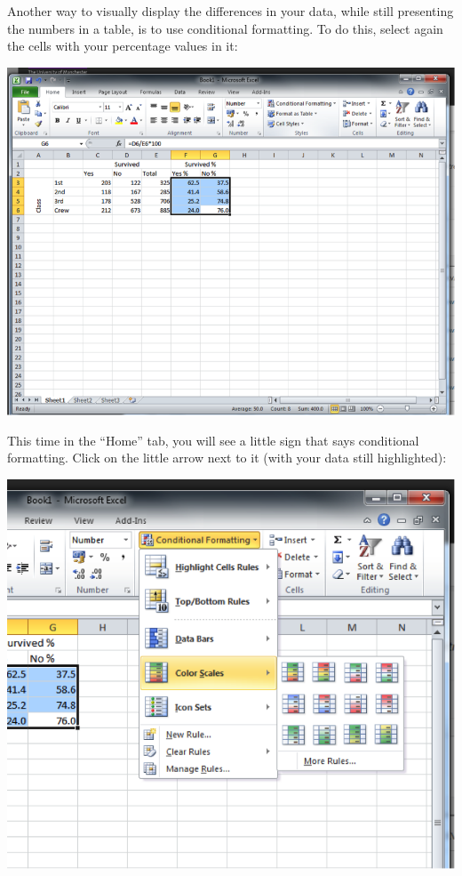\documentclass[]{book}
\theoremstyle{definition}
\theoremstyle{definition}
\theoremstyle{definition}
\theoremstyle{remark}
\begin{document}
Another way to visually display the differences in your data, while
still presenting the numbers in a table, is to use conditional
formatting. To do this, select again the cells with your percentage
values in it:

\includegraphics{imgs/cond_form.png}

This time in the ``Home'' tab, you will see a little sign that says
conditional formatting. Click on the little arrow next to it (with your
data still highlighted):

\includegraphics{imgs/cond_form_2.png}
\end{document}
